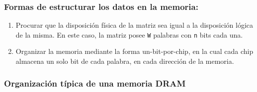 \documentclass{article}
\begin{document}
\subsubsection{Formas de estructurar los datos en la memoria:}
\label{sec:orgc53b7c3}
\begin{enumerate}
\item Procurar que la disposición física de la matriz sea igual a la
disposición lógica de la misma. En este caso, la matriz posee \texttt{W}
palabras con \texttt{n} bits cada una.
\item Organizar la memoria mediante la forma un-bit-por-chip, en la
cual cada chip almacena un solo bit de cada palabra, en cada
dirección de la memoria.
\end{enumerate}
\subsubsection{Organización típica de una memoria DRAM}
\label{sec:org63f1fb8}
\end{document}
